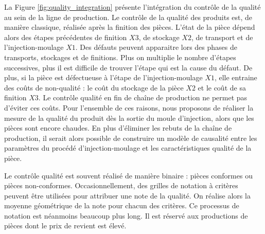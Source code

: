 La Figure \ref{fig:quality_integration} présente l'intégration du contrôle de la qualité au sein de la ligne de production.
Le contrôle de la qualité des produits est, de manière classique, réalisée après la finition des pièces.
L'état de la pièce dépend alors des étapes précédentes de finition $X3$, de stockage $X2$, de transport et de l'injection-moulage $X1$.
Des défauts peuvent apparaitre lors des phases de transports, stockages et de finitions.
Plus on multiplie le nombre d'étapes successives, plus il est difficile de trouver l'étape qui est la cause du défaut.
De plus, si la pièce est défectueuse à l'étape de l'injection-moulage $X1$, elle entraine des coûts de non-qualité : le coût du stockage de la pièce $X2$ et le coût de sa finition $X3$.
Le contrôle qualité en fin de chaîne de production ne permet pas d'éviter ces coûts.
Pour l'ensemble de ces raisons, nous proposons de réaliser la mesure de la qualité du produit dès la sortie du moule d'injection, alors que les pièces sont encore chaudes.
En plus d'éliminer les rebuts de la chaîne de production, il serait alors possible de construire un modèle de causalité entre les paramètres du procédé d'injection-moulage et les caractéristiques qualité de la pièce.

Le contrôle qualité est souvent réalisé de manière binaire : pièces conformes ou pièces non-conformes.
Occasionnellement, des grilles de notation à critères peuvent être utilisées pour attribuer une note de la qualité.
On réalise alors la moyenne géométrique de la note pour chacun des critères.
Ce processus de notation est néanmoins beaucoup plus long.
Il est réservé aux productions de pièces dont le prix de revient est élevé.

